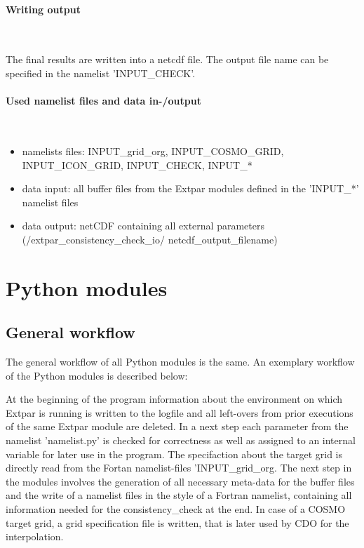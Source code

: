 \documentclass[a4paper,10pt,DIV14,BCOR1cm,titlepage,twoside]{scrartcl}
\begin{document}
\paragraph{Writing output}\ \par\medskip\noindent
The final results are written into a netcdf file. The output file name can be specified in the namelist 'INPUT\_CHECK'.\par\medskip\noindent
\paragraph{Used namelist files and data in-/output}\ \par\medskip\noindent
\begin{itemize}
 \item namelists files: INPUT\_grid\_org, INPUT\_COSMO\_GRID, INPUT\_ICON\_GRID, INPUT\_CHECK, INPUT\_*
 \item data input: all buffer files from the Extpar modules defined in the 'INPUT\_*' namelist files
 \item data output: netCDF containing all external parameters (/extpar\_consistency\_check\_io/ netcdf\_output\_filename)
\end{itemize}

\clearpage

\section{Python modules}\label{Python modules}

\subsection{General workflow}\label{General workflow}
The general workflow of all Python modules is the same. An exemplary workflow of the Python modules is described below:

\noindent At the beginning of the program information about the environment on which Extpar is running is written to the logfile and all left-overs from prior executions of the same Extpar module are deleted. In a next step each parameter from the namelist 'namelist.py' is checked for correctness as well as assigned to an internal variable for later use in the program. The specifaction about the target grid is directly read from the Fortan namelist-files 'INPUT\_grid\_org. The next step in the modules involves the generation of all necessary meta-data for the buffer files and the write of a namelist files in the style of a Fortran namelist, containing all information needed for the consistency\_check at the end. In case of a COSMO target grid, a grid specification file is written, that is later used by CDO for the interpolation. 
\end{document}
